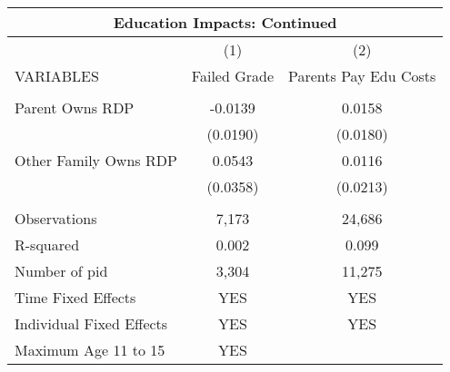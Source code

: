 \begin{tabular}{lcc}
\multicolumn{3}{c}{Education Impacts: Continued} \\ \hline
 & (1) & (2) \\
VARIABLES & Failed Grade & Parents Pay Edu Costs \\ \hline
 &  &  \\
Parent Owns RDP & -0.0139 & 0.0158 \\
 & (0.0190) & (0.0180) \\
Other Family Owns RDP & 0.0543 & 0.0116 \\
 & (0.0358) & (0.0213) \\
 &  &  \\
Observations & 7,173 & 24,686 \\
R-squared & 0.002 & 0.099 \\
Number of pid & 3,304 & 11,275 \\
Time Fixed Effects & YES & YES \\
Individual Fixed Effects & YES & YES \\
 Maximum Age 11 to 15 & YES &  \\ \hline
\end{tabular}

